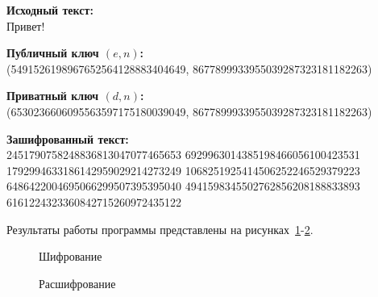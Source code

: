 \textbf{Исходный текст:} \\
    Привет!

\textbf{Публичный ключ $(e, n)$:} \\
    (5491526198967652564128883404649, 8677899933955039287323181182263)

\textbf{Приватный ключ $(d, n)$:} \\
    (6530236606095563597175180039049, 8677899933955039287323181182263)

\textbf{Зашифрованный текст:} \\
    2451790758248836813047077465653 6929963014385198466056100423531
    1792994633186142959029214273249 1068251925414506252246529379223
    6486422004695066299507395395040 4941598345502762856208188833893
    6161224323360842715260972435122

Результаты работы программы представлены на рисунках~\ref{ris:encode-test-2}-\ref{ris:decode-test-2}.

\vspace{\baselineskip}
\begin{figure}[H]
    \caption{Шифрование}
\label{ris:encode-test-2}
\end{figure}

\vspace{\baselineskip}
\begin{figure}[H]
    \caption{Расшифрование}
\label{ris:decode-test-2}
\end{figure}
